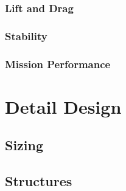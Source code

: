 \documentclass[report]{byu-aero}
\begin{document}
\subsubsection{Lift and Drag}
\label{sssec:liftdrag}




\subsubsection{Stability}
\label{sssec:stability}



\subsubsection{Mission Performance}
\label{sssec:missionperformance}





\section{Detail Design} %
\label{sec:detaildesign}




\subsection{Sizing}
\label{ssec:sizing}




\subsection{Structures}
\label{ssec:structures}
\end{document}
